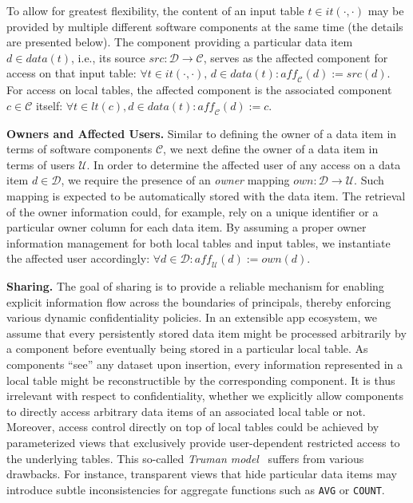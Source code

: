 \documentclass{src/acm_proc_article-sp} \else
\newcommand\myparagraph[1]{\medskip\noindent\textbf{#1.}}
\newcommand\cC{\ensuremath{\mathcal{C}}\xspace}
\newcommand\cD{\ensuremath{\mathcal{D}}\xspace}
\newcommand\cU{\ensuremath{\mathcal{U}}\xspace}
\begin{document}
To allow for greatest
flexibility, the content of an input table $t \in
\mathit{it(\cdot, \cdot)}$ may be provided by multiple
different software components at the same time (the details
are presented below). The component providing a particular
data item $d \in \mathit{data(t)}$, i.e., its source
$\mathit{src} \colon \cD \rightarrow \cC$, serves as the
affected component for access on that input table:
$
    \forall t \in \mathit{it(\cdot, \cdot)}, \, d \in \mathit{data(t)} \colon \mathit{aff_{\cC}(d)} := \mathit{src(d)}
$.
For access on local tables, the affected component is the
associated component $c \in \cC$ itself:
$
    \forall t \in \mathit{lt(c)}, d \in \mathit{data(t)} \colon \mathit{aff_{\cC}(d) := c}
$.








\myparagraph{Owners and Affected Users}
Similar to defining the owner of a data item in terms of
software components $\cC$, we next define the owner of a
data item in terms of users $\cU$. In order to determine the
affected user of any access on a data item $d \in \cD$, we
require the presence of an
\emph{owner} mapping
$
  \mathit{own} \colon \cD \rightarrow \cU
$.
Such mapping is expected to be automatically stored with the
data item. The retrieval of the owner information could, for
example, rely on a unique identifier or a particular
owner column for each data item.
By assuming a proper owner information management for both local
tables and input tables, we instantiate the affected user accordingly:
$
\forall d \in \cD \colon \mathit{aff_{\cU}(d)} := \mathit{own(d)}
$.

\myparagraph{Sharing}
The goal of sharing is to provide a reliable mechanism for enabling
explicit information flow across the boundaries of principals,
thereby enforcing various dynamic confidentiality policies.
In an extensible app ecosystem, we assume that every persistently
stored data item might be processed arbitrarily by a component before
eventually being stored in a particular local table. As components
``see'' any dataset upon insertion, every information represented in
a local table might be reconstructible by the corresponding
component. It is thus irrelevant with respect to confidentiality,
whether we explicitly allow components to directly access arbitrary
data items of an associated local table or not. Moreover, access
control directly on top of local tables could be achieved by
pa\-ram\-e\-ter\-ized views that exclusively provide user-dependent
restricted access to the underlying tables. This so-called
\emph{Truman model}~\cite{Rizvi2004:QueryRewriting} suffers from
various drawbacks. For instance, transparent views that hide
particular data items may introduce subtle inconsistencies for
aggregate functions such as \texttt{AVG} or \texttt{COUNT}.
\end{document}
